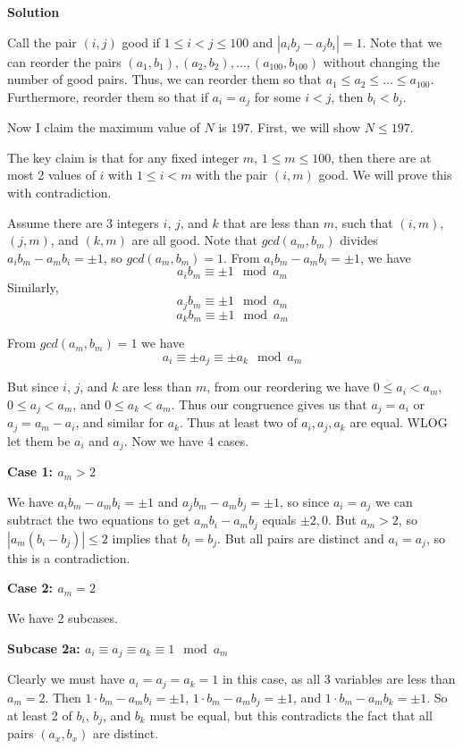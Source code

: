 \begin{enumerate}
 



\textbf{Solution}

Call the pair $(i, j)$ good if $1\leq i < j \leq 100$ and $|a_ib_j-a_jb_i|=1$. Note that we can reorder the pairs $(a_1, b_1), (a_2, b_2), \ldots, (a_{100}, b_{100})$ without changing the number of good pairs. Thus, we can reorder them so that $a_1\leq a_2\leq\ldots\leq a_{100}$. Furthermore, reorder them so that if $a_i=a_j$ for some $i<j$, then $b_i<b_j$. 

 Now I claim the maximum value of $N$ is $\boxed{197}$. First, we will show $N\leq 197$.

 The key claim is that for any fixed integer $m$, $1\leq m \leq 100$, then there are at most 2 values of $i$ with $1\leq i<m$ with the pair $(i, m)$ good. We will prove this with contradiction.

 Assume there are 3 integers $i$, $j$, and $k$ that are less than $m$, such that $(i, m)$, $(j, m)$, and $(k, m)$ are all good. Note that $gcd(a_m, b_m)$ divides $a_ib_m-a_mb_i=\pm 1$, so $gcd(a_m, b_m)=1$. From $a_ib_m-a_mb_i=\pm 1$, we have 
 \[a_ib_m\equiv \pm 1 \mod a_m\]Similarly, 
 \[a_jb_m\equiv \pm 1 \mod a_m\] 
 \[a_kb_m\equiv \pm 1 \mod a_m\]

 From $gcd(a_m, b_m)=1$ we have 
 \[a_i\equiv \pm a_j \equiv \pm a_k \mod a_m\]

 But since $i$, $j$, and $k$ are less than $m$, from our reordering we have $0\leq a_i<a_m$, $0\leq a_j<a_m$, and $0\leq a_k<a_m$. Thus our congruence gives us that $a_j=a_i$ or $a_j=a_m-a_i$, and similar for $a_k$. Thus at least two of $a_i, a_j, a_k$ are equal. WLOG let them be $a_i$ and $a_j$. Now we have 4 cases.

 \textbf{Case 1: $a_m>2$}

 We have $a_ib_m-a_mb_i=\pm 1$ and $a_jb_m-a_mb_j=\pm 1$, so since $a_i=a_j$ we can subtract the two equations to get $a_mb_i-a_mb_j$ equals $\pm 2, 0$. But $a_m>2$, so $|a_m(b_i-b_j)|\leq 2$ implies that $b_i=b_j$. But all pairs are distinct and $a_i=a_j$, so this is a contradiction. 

 \textbf{Case 2: $a_m=2$}

 We have 2 subcases.

 \textbf{Subcase 2a: $a_i\equiv a_j\equiv a_k\equiv 1 \mod a_m$}

 Clearly we must have $a_i=a_j=a_k=1$ in this case, as all 3 variables are less than $a_m=2$. Then $1\cdot b_m-a_mb_i=\pm 1$, $1\cdot b_m-a_mb_j=\pm 1$, and $1\cdot b_m-a_mb_k=\pm 1$. So at least 2 of $b_i$, $b_j$, and $b_k$ must be equal, but this contradicts the fact that all pairs $(a_x, b_x)$ are distinct.


\end{enumerate}
